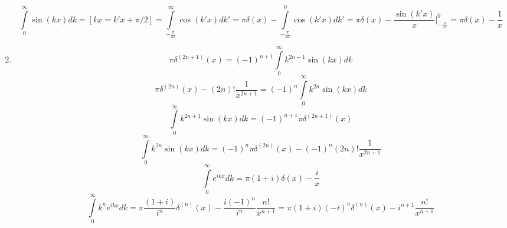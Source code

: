 \begin{enumerate}
\[	\]
	\[
		\int\limits_{0}^{\infty} \sin (kx) dk = [kx = k'x + \pi/2] = \int\limits_{-\frac{\pi}{2x}}^{\infty} \cos (k'x) dk' =
		\pi \delta(x) - \int\limits_{-\frac{\pi}{2x}}^{0} \cos (k'x) dk' = 
		\pi \delta(x) - \frac{\sin (k'x)}{x} \Big|_{-\frac{\pi}{2x}}^0 = 
		\pi \delta(x) - \frac{1}{x}
	\]
	\item 
	\[
		\pi \delta^{(2n+1)}(x) = (-1)^{n + 1} \int\limits_{0}^{\infty} k^{2n + 1} \sin (kx) dk
	\]
	\[
		\pi \delta^{(2n)}(x) - (2n)! \frac{1}{x^{2n+1}} = (-1)^{n} \int\limits_{0}^{\infty} k^{2n} \sin (kx) dk
	\]
	\[
		\int\limits_{0}^{\infty} k^{2n + 1} \sin (kx) dk = (-1)^{n + 1} \pi \delta^{(2n+1)}(x)
	\]
	\[
		\int\limits_{0}^{\infty} k^{2n} \sin (kx) dk = (-1)^{n} \pi \delta^{(2n)}(x) - (-1)^{n} (2n)! \frac{1}{x^{2n+1}}
	\]
	\[
		\int\limits_0^\infty e^{ikx} dk = \pi (1 + i) \delta(x) - \frac{i}{x}
	\]
	\[
		\int\limits_0^\infty k^n e^{ikx} dk = \pi \frac{(1 + i)}{i^n} \delta^{(n)}(x) - \frac{i(-1)^n}{i^n} \frac{n!}{x^{n+1}} =
		\pi (1 + i) (-i)^n \delta^{(n)}(x) - i^{n+1} \frac{n!}{x^{n+1}}
	\]
\end{enumerate}